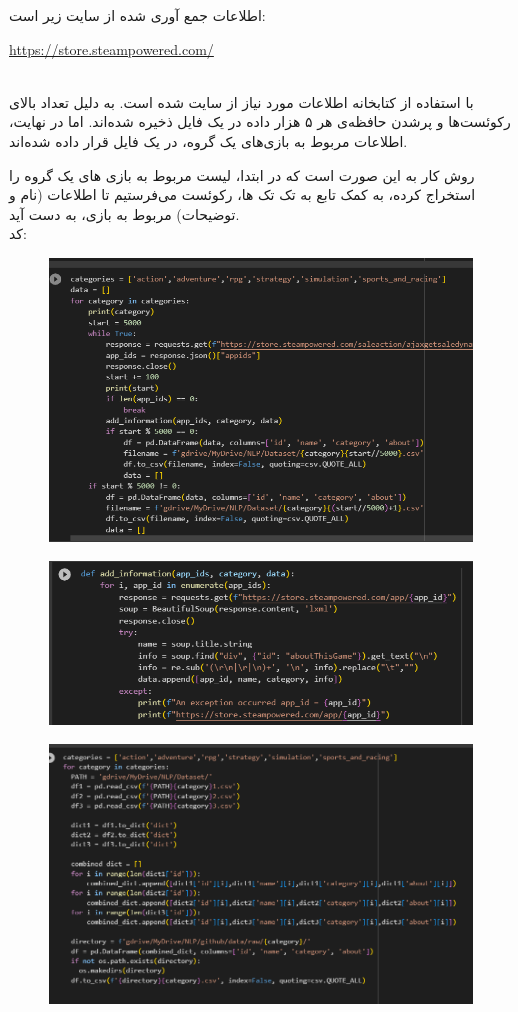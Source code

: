 اطلاعات جمع آوری شده از سایت زیر است:
\\
 \begin{latin}
 \url{https://store.steampowered.com/}
 \end{latin}
 \\
با استفاده از کتابخانه  اطلاعات مورد نیاز از سایت  شده است. به دلیل تعداد بالای رکوئست‌ها و پرشدن حافظه‌ی  هر ۵ هزار داده در یک فایل ذخیره شده‌اند. اما در نهایت، اطلاعات مربوط به بازی‌های یک گروه، در یک فایل قرار داده شده‌اند.

روش کار به این صورت است که در ابتدا، لیست  مربوط به بازی های یک گروه را استخراج کرده، به کمک تابع  به تک تک ‌ها، رکوئست می‌فرستیم تا اطلاعات (نام و توضیحات) مربوط به بازی، به دست آید.
\\
کد:
\begin{figure}[H]
    \centering
    \includegraphics[width=0.7\linewidth]{./images/c_code1.png}
   \end{figure}


\begin{figure}[H]
    \centering
    \includegraphics[width=0.7\linewidth]{./images/c_code2.png}
   \end{figure}

\begin{figure}[H]
    \centering
    \includegraphics[width=0.7\linewidth]{./images/c_code3.png}
   \end{figure}


